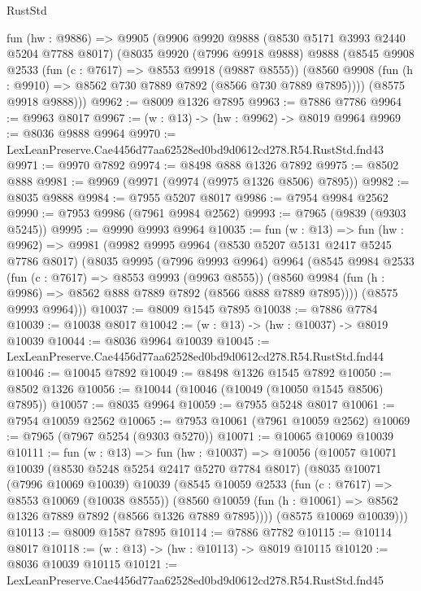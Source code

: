 \begin{lexlean}{RustStd}
\begin{coremodule}
  fun (hw : @9886) =>
  @9905
    (@9906
      @9920
      @9888
      (@8530 @5171 @3993 @2440 @5204 @7788 @8017)
      (@8035
        @9920
        (@7996 @9918 @9888)
        @9888
        (@8545
          @9908
          @2533
          (fun (c : @7617) => @8553 @9918 (@9887 @8555))
          (@8560 @9908 (fun (h : @9910) => @8562 @730 @7889 @7892 (@8566 @730 @7889 @7895))))
        (@8575 @9918 @9888)))
@9962 := @8009 @1326 @7895
@9963 := @7886 @7786
@9964 := @9963 @8017
@9967 := (w : @13) -> (hw : @9962) -> @8019 @9964
@9969 := @8036 @9888 @9964
@9970 := LexLeanPreserve.Cae4456d77aa62528ed0bd9d0612cd278.R54.RustStd.fnd43
@9971 := @9970 @7892
@9974 := @8498 @888 @1326 @7892
@9975 := @8502 @888
@9981 := @9969 (@9971 (@9974 (@9975 @1326 @8506) @7895))
@9982 := @8035 @9888
@9984 := @7955 @5207 @8017
@9986 := @7954 @9984 @2562
@9990 := @7953 @9986 (@7961 @9984 @2562)
@9993 := @7965 (@9839 (@9303 @5245))
@9995 := @9990 @9993 @9964
@10035 := fun (w : @13) =>
  fun (hw : @9962) =>
  @9981
    (@9982
      @9995
      @9964
      (@8530 @5207 @5131 @2417 @5245 @7786 @8017)
      (@8035
        @9995
        (@7996 @9993 @9964)
        @9964
        (@8545
          @9984
          @2533
          (fun (c : @7617) => @8553 @9993 (@9963 @8555))
          (@8560 @9984 (fun (h : @9986) => @8562 @888 @7889 @7892 (@8566 @888 @7889 @7895))))
        (@8575 @9993 @9964)))
@10037 := @8009 @1545 @7895
@10038 := @7886 @7784
@10039 := @10038 @8017
@10042 := (w : @13) -> (hw : @10037) -> @8019 @10039
@10044 := @8036 @9964 @10039
@10045 := LexLeanPreserve.Cae4456d77aa62528ed0bd9d0612cd278.R54.RustStd.fnd44
@10046 := @10045 @7892
@10049 := @8498 @1326 @1545 @7892
@10050 := @8502 @1326
@10056 := @10044 (@10046 (@10049 (@10050 @1545 @8506) @7895))
@10057 := @8035 @9964
@10059 := @7955 @5248 @8017
@10061 := @7954 @10059 @2562
@10065 := @7953 @10061 (@7961 @10059 @2562)
@10069 := @7965 (@7967 @5254 (@9303 @5270))
@10071 := @10065 @10069 @10039
@10111 := fun (w : @13) =>
  fun (hw : @10037) =>
  @10056
    (@10057
      @10071
      @10039
      (@8530 @5248 @5254 @2417 @5270 @7784 @8017)
      (@8035
        @10071
        (@7996 @10069 @10039)
        @10039
        (@8545
          @10059
          @2533
          (fun (c : @7617) => @8553 @10069 (@10038 @8555))
          (@8560 @10059 (fun (h : @10061) => @8562 @1326 @7889 @7892 (@8566 @1326 @7889 @7895))))
        (@8575 @10069 @10039)))
@10113 := @8009 @1587 @7895
@10114 := @7886 @7782
@10115 := @10114 @8017
@10118 := (w : @13) -> (hw : @10113) -> @8019 @10115
@10120 := @8036 @10039 @10115
@10121 := LexLeanPreserve.Cae4456d77aa62528ed0bd9d0612cd278.R54.RustStd.fnd45

\end{coremodule}
\end{lexlean}
